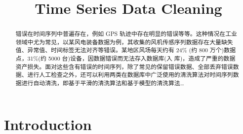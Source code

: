 \documentclass{article}
\begin{document}
\title{Time Series Data Cleaning}

\maketitle


\begin{abstract}
错误在时间序列中普遍存在，例如 GPS 轨迹中存在明显的错误等等。这种情况在工业领域中尤为常见，以某风电装备数据为例，其收集的风机传感序列数据存在大量缺失值、异常值、时间标签无法对齐等错误。某地区风场每天约有 24\% (约 800 万个)数据点，31\%(约 5000 台)设备，因数据错误而无法存入数据库(入 库)，造成了严重的数据资产损失。面对这些含有错误的时间序列，除了常见的保留错误数据、全部丢弃错误数据、进行人工检查之外，还可以利用两类在数据库中广泛使用的清洗算法对时间序列数据进行自动清洗，即基于平滑的清洗算法和基于模型的清洗算法…

\end{abstract}

\section{Introduction}
\end{document}
